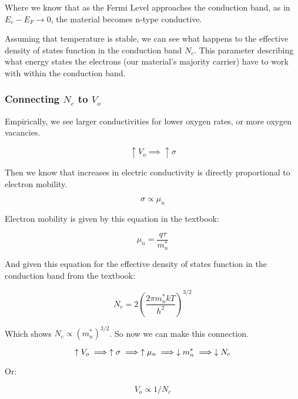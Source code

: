 \documentclass{article}
\begin{document}
Where we know that as the Fermi Level approaches the conduction band, as in \(E_c - E_F \to 0\), the material becomes n-type conductive.

\smallskip

Assuming that temperature is stable, we can see what happens to the effective density of states function in the conduction band \(N_c\). This parameter describing what energy states the electrons (our material's majority carrier) have to work with within the conduction band. 

\subsubsection{Connecting \(N_c\) to \(V_o\)}

Empirically, we see larger conductivities for lower oxygen rates, or more oxygen vacancies.

\begin{equation}
    \uparrow V_o \implies \uparrow \sigma
\end{equation}

Then we know that increases in electric conductivity is directly proportional to electron mobility.

\begin{equation}
    \sigma \propto \mu_n
\end{equation}

Electron mobility is given by this equation in the textbook:

\begin{equation}
    \mu_n = \frac{q \tau}{m^*_n}
\end{equation}

And given this equation for the effective density of states function in the conduction band from the textbook:

\begin{equation}
    N_c = 2 \left( \frac{2 \pi m^*_n k T}{h^2}\right)^{3/2}
\end{equation}

Which shows \(N_c \propto (m^*_n)^{3/2}\). So now we can make this connection.

\begin{equation}
    \uparrow V_o \implies \uparrow \sigma \implies \uparrow \mu_n \implies \downarrow m^*_n \implies \downarrow N_c \\
\end{equation}

Or:

\begin{equation} 
    V_o \propto 1 / N_c
\end{equation}
\end{document}
